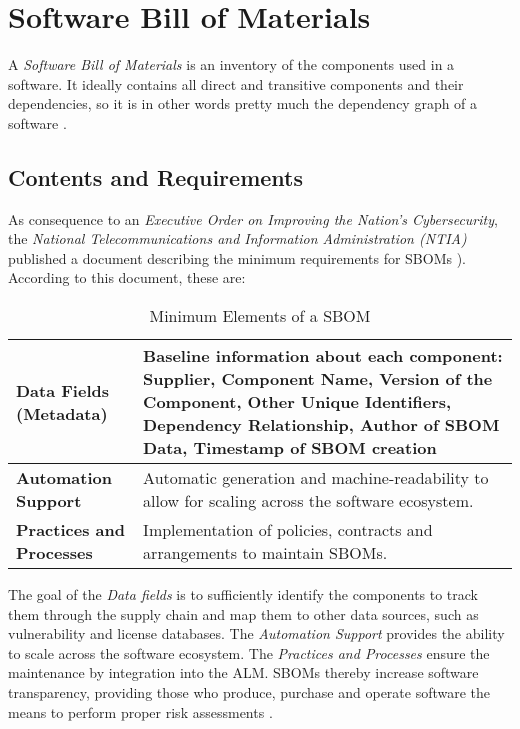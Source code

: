 \section{Software Bill of Materials}
A \textit{Software Bill of Materials} is an inventory of the components used in a software. It ideally contains all direct and transitive components and their dependencies, so it is in other words pretty much the dependency graph of a software \cite{OWASPWebsite,NTIASBOM}.\\

\subsection{Contents and Requirements}
As consequence to an \textit{Executive Order on Improving the Nation's Cybersecurity}, the \textit{National Telecommunications and Information Administration (NTIA)} published a document describing the minimum requirements for SBOMs \cite{ExecutiveOrderSBOM,NTIASBOM}). According to this document, these are:

\begin{table}[H]
	\begin{tabularx}{\linewidth}{|l|X|}
		\hline
		\textbf{Data Fields (Metadata)} & Baseline information about each component: Supplier, Component Name, Version of the Component, Other Unique Identifiers, Dependency Relationship, Author of SBOM Data, Timestamp of SBOM creation \\
		\hline
		\textbf{Automation Support} & Automatic generation and machine-readability to allow for scaling across the software ecosystem. \\
		\hline
		\textbf{Practices and Processes} & Implementation of policies, contracts and arrangements to maintain SBOMs.\\
		\hline
	\end{tabularx}
	\caption[Minimum Elements of a SBOM]{Minimum Elements of a SBOM }
	\label{Tab:ElementsOfSBOM}
\end{table}

\noindent
The goal of the \textit{Data fields} is to sufficiently identify the components to track them through the supply chain and map them to other data sources, such as vulnerability and license databases. The \textit{Automation Support} provides the ability to scale across the software ecosystem. The \textit{Practices and Processes} ensure the maintenance by integration into the ALM. SBOMs thereby increase software transparency, providing those who produce, purchase and operate software the means to perform proper risk assessments \cite{NTIASBOM}.

